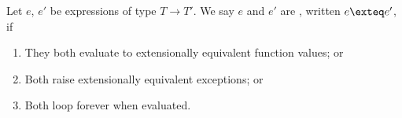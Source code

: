 \begin{node}\label{sml-000B}%
Let $e$, $e'$ be expressions of type $T\to T'$. We say $e$ and $e'$ are
, written $e\exteq e'$, if
\begin{enumerate}
\item They both evaluate to extensionally equivalent function values; or
\item Both raise extensionally equivalent exceptions; or
\item Both loop forever when evaluated.
\end{enumerate}
\end{node}
